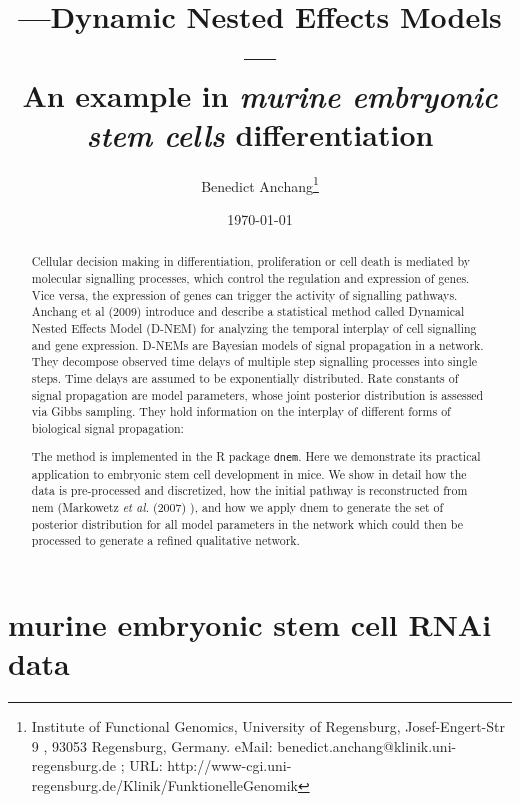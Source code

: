 \documentclass[11pt,a4paper]{article}
\begin{document}
\title{---Dynamic Nested Effects Models --- \\ An example in \emph{murine embryonic stem cells} differentiation}
\author{Benedict Anchang\footnote{Institute of Functional Genomics,
University of Regensburg, Josef-Engert-Str 9 , 93053 Regensburg, Germany. eMail: benedict.anchang@klinik.uni-regensburg.de ; URL: http://www-cgi.uni-regensburg.de/Klinik/FunktionelleGenomik }}
\date{\today}
\maketitle

\begin{abstract}
Cellular decision making in differentiation, proliferation or cell death is mediated by molecular signalling processes, which control the regulation and expression of genes. Vice versa, the expression of  genes can trigger the activity of signalling pathways. Anchang et al (2009)  introduce and describe a statistical method called Dynamical Nested Effects Model (D-NEM) for analyzing the temporal interplay of cell signalling and gene expression. D-NEMs are Bayesian models of signal propagation in a network. They decompose observed time delays of multiple step signalling processes into single steps. Time delays are assumed to be exponentially distributed. Rate constants of signal propagation are model parameters, whose joint posterior distribution is assessed via Gibbs sampling. They hold information on the interplay of different forms of biological signal propagation:

The method is implemented in the R package \texttt{dnem}.
Here we demonstrate  its practical  application to embryonic stem cell development in mice. 
We show in detail how the data is pre-processed and discretized, how the initial  pathway is reconstructed from nem (Markowetz \emph{et al.} (2007) ), and how we apply dnem to generate the set of posterior distribution for all model parameters in the network which could then be processed to generate a refined qualitative network.
\end{abstract}

\section{murine embryonic stem cell RNAi data}
\end{document}
